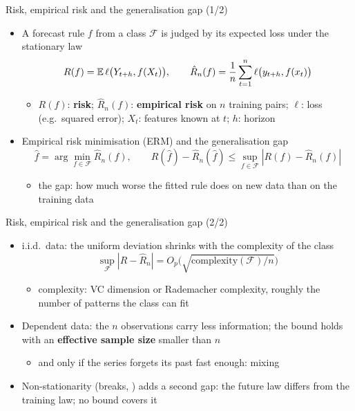 \begin{frame}{Risk, empirical risk and the generalisation gap (1/2)}
\itemsize{\small}
\begin{itemize}
    \item A forecast rule $f$ from a class $\mathcal F$ is judged by its expected loss under the stationary law
    \[ R(f) = \mathbb{E}\,\ell\big(Y_{t+h}, f(X_t)\big), \qquad \hat R_n(f) = \frac1n\sum_{t=1}^n \ell\big(y_{t+h}, f(x_t)\big) \]
    \begin{itemize}
        \item $R(f)$: \textbf{risk}; $\hat R_n(f)$: \textbf{empirical risk} on $n$ training pairs; $\ell$: loss (e.g.\ squared error); $X_t$: features known at $t$; $h$: horizon
    \end{itemize}
    \item Empirical risk minimisation (ERM) and the generalisation gap
    \[ \hat f = \arg\min_{f \in \mathcal F}\hat R_n(f), \qquad R(\hat f) - \hat R_n(\hat f) \le \sup_{f \in \mathcal F}|R(f) - \hat R_n(f)| \]
    \begin{itemize}
        \item the gap: how much worse the fitted rule does on new data than on the training data
    \end{itemize}
\end{itemize}
\end{frame}

\begin{frame}{Risk, empirical risk and the generalisation gap (2/2)}
\itemsize{\small}
\begin{itemize}
    \item i.i.d.\ data: the uniform deviation shrinks with the complexity of the class
    \[ \sup_{\mathcal F}|R - \hat R_n| = O_p\Big(\sqrt{\mathrm{complexity}(\mathcal F)/n}\Big) \]
    \begin{itemize}
        \item complexity: VC dimension or Rademacher complexity, roughly the number of patterns the class can fit
    \end{itemize}
    \item Dependent data: the $n$ observations carry less information; the bound holds with an \textbf{effective sample size} smaller than $n$
    \begin{itemize}
        \item and only if the series forgets its past fast enough: mixing
    \end{itemize}
    \item Non-stationarity (breaks, ) adds a second gap: the future law differs from the training law; no bound covers it
\end{itemize}
\end{frame}

